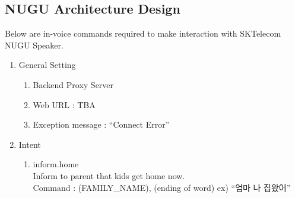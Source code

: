 \documentclass[conference]{IEEEtran}
\begin{document}
\subsection{NUGU Architecture Design}
Below are in-voice commands required to make interaction with SKTelecom NUGU Speaker.\\
\begin{enumerate}
    \item General Setting
    \begin{enumerate}
        \item Backend Proxy Server
        \item Web URL : TBA
        \item Exception message : “Connect Error”\\
    \end{enumerate}
    \item Intent
    \begin{enumerate}
        \item inform.home\\
        Inform to parent that kids get home now.\\
        Command : (FAMILY\_NAME), (ending of word) ex) “엄마 나 집왔어”
        

\end{enumerate}
\end{enumerate}
\end{document}
